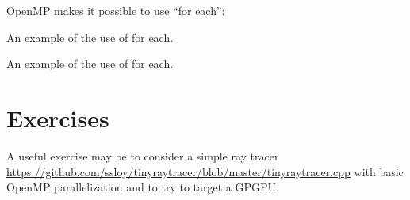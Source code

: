 OpenMP makes it possible to use ``for each'':

\raggedbottom
\begin{codebox}[]{\href{https://godbolt.org/z/}{\ExternalLink}}
\footnotesize An example of the use of for each.
\tcblower
{}
\end{codebox}

\raggedbottom
\begin{codebox}[]{\href{https://godbolt.org/z/enK6dYEoW}{\ExternalLink}}
\footnotesize An example of the use of for each.
\tcblower
{}
\end{codebox}

\section{Exercises}
\label{sec:}

A useful exercise may be to consider a simple ray tracer \url{https://github.com/ssloy/tinyraytracer/blob/master/tinyraytracer.cpp} with basic OpenMP parallelization and to try to target a GPGPU. 



